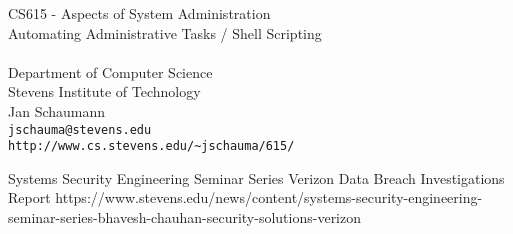 \documentclass[xga]{xdvislides}
\begin{document}
\setfontphv

\lhead{\slidetitle}                               %
\cfoot{\relax}                               %
\rfoot{\Gray{\today}}

\vspace*{\fill}
\begin{center}
	\Hugesize
		CS615 - Aspects of System Administration\\ [1em]
		Automating Administrative Tasks / Shell Scripting\\ [1em]

	\hspace*{5mm}\blueline\\ [1em]
	\Normalsize
		Department of Computer Science\\
		Stevens Institute of Technology\\
		Jan Schaumann\\
		\verb+jschauma@stevens.edu+\\
		\verb+http://www.cs.stevens.edu/~jschauma/615/+
\end{center}
\vspace*{\fill}

Systems Security Engineering Seminar Series
Verizon Data Breach Investigations Report
https://www.stevens.edu/news/content/systems-security-engineering-seminar-series-bhavesh-chauhan-security-solutions-verizon
\end{document}
